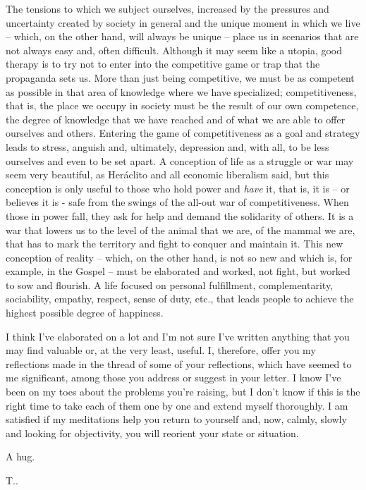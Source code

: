 \documentclass[]{book}
\begin{document}
The tensions to which we subject ourselves, increased by the pressures and uncertainty created by society in general and the unique moment in which we live -- which, on the other hand, will always be unique -- place us in scenarios that are not always easy and, often difficult. Although it may seem like a utopia, good therapy is to try not to enter into the competitive game or trap that the propaganda sets us. More than just being competitive, we must be as competent as possible in that area of knowledge where we have specialized; competitiveness, that is, the place we occupy in society must be the result of our own competence, the degree of knowledge that we have reached and of what we are able to offer ourselves and others. Entering the game of competitiveness as a goal and strategy leads to stress, anguish and, ultimately, depression and, with all, to be less ourselves and even to be set apart. A conception of life as a struggle or war may seem very beautiful, as Heráclito and all economic liberalism said, but this conception is only useful to those who hold power and \emph{have} it, that is, it is -- or believes it is - safe from the swings of the all-out war of competitiveness. When those in power fall, they ask for help and demand the solidarity of others. It is a war that lowers us to the level of the animal that we are, of the mammal we are, that has to mark the territory and fight to conquer and maintain it. This new conception of reality -- which, on the other hand, is not so new and which is, for example, in the Gospel -- must be elaborated and worked, not fight, but worked to sow and flourish. A life focused on personal fulfillment, complementarity, sociability, empathy, respect, sense of duty, etc., that leads people to achieve the highest possible degree of happiness.

I think I've elaborated on a lot and I'm not sure I've written anything that you may find valuable or, at the very least, useful. I, therefore, offer you my reflections made in the thread of some of your reflections, which have seemed to me significant, among those you address or suggest in your letter. I know I've been on my toes about the problems you're raising, but I don't know if this is the right time to take each of them one by one and extend myself thoroughly. I am satisfied if my meditations help you return to yourself and, now, calmly, slowly and looking for objectivity, you will reorient your state or situation.

A hug.

T..
\end{document}
